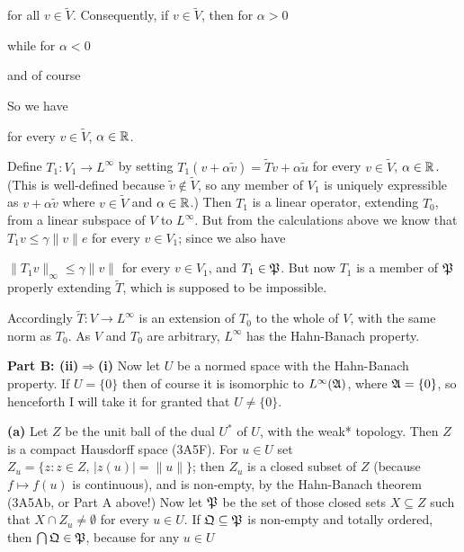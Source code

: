 {\noindent for all $v\in \tilde V$.   Consequently, if $v\in \tilde V$,
then for $\alpha>0$


\noindent while for $\alpha<0$


\noindent and of course


\noindent So we have


\noindent for every $v\in \tilde V$, $\alpha\in\Bbb R$.

Define $T_1:V_1\to L^{\infty}$ by setting $T_1(v+\alpha \tilde v)
=\tilde Tv+\alpha
\tilde u$ for every $v\in \tilde V$, $\alpha\in\Bbb R$.   (This is
well-defined because $\tilde v\notin\tilde V$, so any member of $V_1$ is
uniquely expressible as $v+\alpha\tilde v$ where $v\in\tilde V$ and
$\alpha\in\Bbb R$.)    Then $T_1$ is a linear
operator, extending $T_0$, from a linear subspace of $V$ to
$L^{\infty}$.
But from the calculations above we know that $T_1v\le\gamma\|v\|e$ for
every $v\in V_1$;  since we also have


\noindent $\|T_1v\|_{\infty}\le\gamma\|v\|$ for every $v\in V_1$, and
$T_1\in\frak P$.   But now $T_1$ is a member of $\frak P$ properly
extending $\tilde T$, which is supposed to be impossible.\ \Bang\Qed

Accordingly $\tilde T:V\to L^{\infty}$ is an extension of $T_0$ to the
whole of $V$, with the same norm as $T_0$.   As $V$ and $T_0$ are
arbitrary, $L^{\infty}$ has the Hahn-Banach property.

\medskip

{\bf Part B: (ii)$\Rightarrow$(i)} Now let $U$ be a normed space with
the Hahn-Banach property.   If $U=\{0\}$ then of course it is isomorphic
to $L^{\infty}(\frak A)$, where $\frak A=\{0\}$, so henceforth I will
take it for granted that $U\ne\{0\}$.

\medskip

{\bf (a)} Let $Z$ be the unit ball of the dual $U^*$ of $U$, with the
weak* topology.   Then $Z$ is a compact Hausdorff space (3A5F).
For $u\in U$ set $Z_u=\{z:z\in Z,\,|z(u)|=\|u\|\}$;  then $Z_u$ is a
closed subset of $Z$ (because $f\mapsto f(u)$ is continuous), and is
non-empty, by the Hahn-Banach theorem (3A5Ab, or Part A above!)
Now let $\frak P$ be the set of those closed sets $X\subseteq Z$ such
that $X\cap Z_u\ne\emptyset$ for every $u\in U$.   If
$\frak Q\subseteq\frak P$ is non-empty and totally ordered, then
$\bigcap\frak Q\in\frak P$, because for any $u\in U$

}
